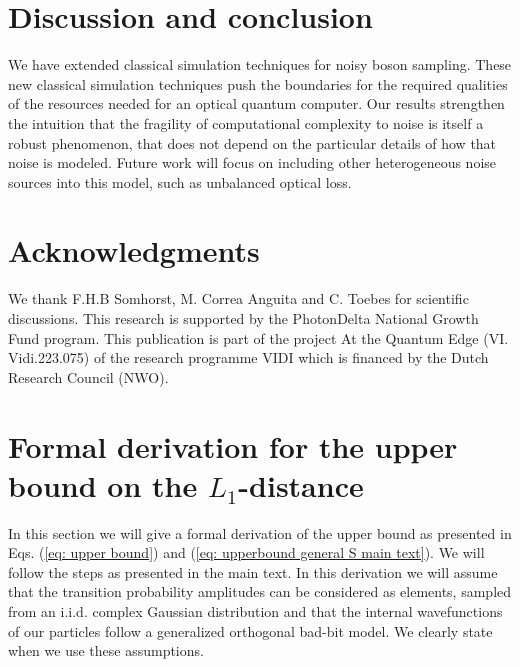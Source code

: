 \documentclass[10pt,aps,pra,twocolumn,superscriptaddress]{revtex4-2}
\begin{document}
\section{Discussion and conclusion}
\label{sec: discussion and conclusion}
We have extended classical simulation techniques for noisy boson sampling. These new classical simulation techniques push the boundaries for the required qualities of the resources needed for an optical quantum computer. Our results strengthen the intuition that the fragility of computational complexity to noise is itself a robust phenomenon, that does not depend on the particular details of how that noise is modeled. Future work will focus on including other heterogeneous noise sources into this model, such as unbalanced optical loss.  

\section{Acknowledgments}
\label{sec: Acknowledgments}
We thank F.H.B Somhorst, M. Correa Anguita and C. Toebes for scientific discussions. This research is supported by the PhotonDelta National Growth Fund program. This publication is part of the project At the Quantum Edge (VI. Vidi.223.075) of the research programme VIDI which is financed by the Dutch Research Council (NWO).

\appendix
\section{Formal derivation for the upper bound on the $L_1$-distance}
\label{sec: derivation upper bound}
In this section we will give a formal derivation of the upper bound as presented in
Eqs. (\ref{eq: upper bound}) and (\ref{eq: upperbound general S main text}).
We will follow the steps as presented in the main text. In this derivation we will assume that the transition probability amplitudes can be considered as elements, sampled from an i.i.d. complex Gaussian distribution and that the internal wavefunctions of our particles follow a generalized orthogonal bad-bit model. We clearly state when we use these assumptions. \\
\end{document}
